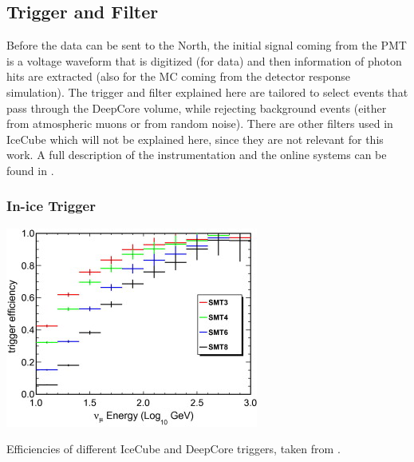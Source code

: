 \subsection{Trigger and Filter} 

Before the data can be sent to the North, the initial signal coming from the PMT is a voltage waveform that is digitized (for data) and then information of photon hits are extracted (also for the MC coming from the detector response simulation). The trigger and filter explained here are tailored to select events that pass through the DeepCore volume, while rejecting background events (either from atmospheric muons or from random noise). There are other filters used in IceCube which will not be explained here, since they are not relevant for this work. A full description of the instrumentation and the online systems can be found in .


\subsubsection{In-ice Trigger} 


\begin{marginfigure}
    \includegraphics{figures/simulation_and_processing/trigger/trigger_efficiency.jpg}
	\caption[IceCube trigger efficiencies]{Efficiencies of different IceCube and DeepCore triggers, taken from \cite{DeepCore_design_Abbasi2012615}.}
\end{marginfigure}

